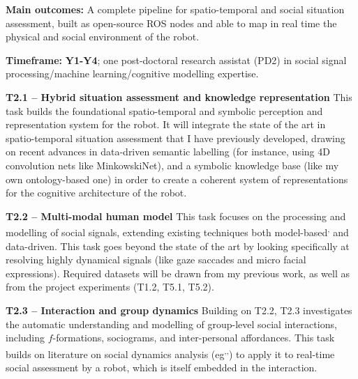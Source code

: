 \begin{framed}
    \textbf{Main outcomes:} A complete pipeline for spatio-temporal and social
    situation assessment, built as open-source ROS nodes and able to map in
    real time the physical and social environment of the robot.

    \textbf{Timeframe:} \textbf{Y1-Y4}; one post-doctoral research assistat (PD2) in social
signal processing/machine learning/cognitive modelling expertise.
\end{framed}

\textbf{T2.1 -- Hybrid situation assessment and knowledge representation} This
task builds the foundational spatio-temporal and symbolic perception and
representation system for the robot. It will integrate the state of the art in
spatio-temporal situation assessment that I have previously
developed,
drawing on recent
advances in data-driven semantic labelling (for instance, using 4D convolution
nets like MinkowskiNet), and a symbolic knowledge base (like
my own ontology-based one) in order to create a coherent
system of representations for the cognitive architecture of the robot.

\textbf{T2.2 -- Multi-modal human model} This task focuses on the processing and
modelling of social signals, extending existing techniques both
model-based\textsuperscript{,} and
data-driven. This task goes beyond the
state of the art by looking specifically at resolving highly dynamical signals
(like gaze saccades and micro facial expressions). Required datasets will be
drawn from my previous work, as well as from
the project experiments (T1.2, T5.1, T5.2).

\textbf{T2.3 -- Interaction and group dynamics} Building on T2.2, T2.3
investigates the automatic understanding and modelling of group-level social
interactions, including
$f$-formations,
sociograms, and inter-personal
affordances. This task builds on literature on
social dynamics analysis
(eg\textsuperscript{,}\textsuperscript{,})
to apply it to real-time social assessment by a robot, which is itself embedded
in the interaction.

